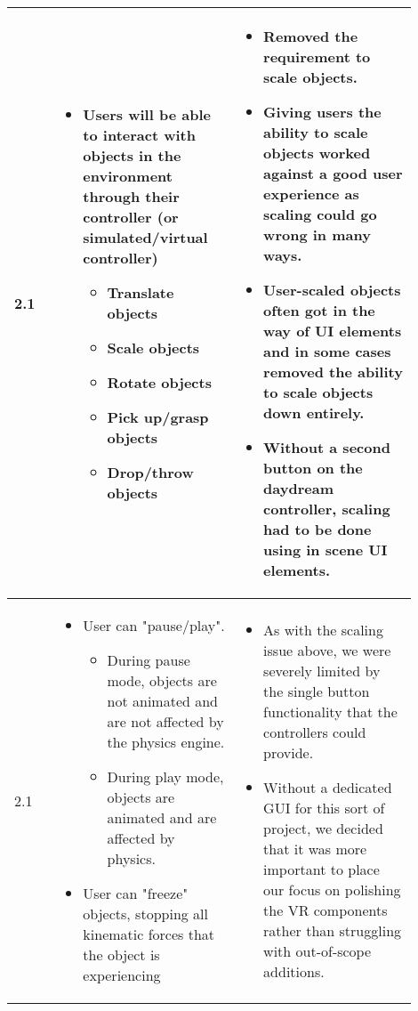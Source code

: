 \documentclass[onecolumn, draftclsnofoot,10pt, compsoc]{IEEEtran}
\begin{document}
\begin{longtable}{ |p{0.1\linewidth}|p{0.4\linewidth}|p{0.4\linewidth}| }
2.1
&
\begin{itemize}
    \item Users will be able to interact with objects in the environment through their controller (or simulated/virtual controller)
    \begin{itemize}
        \item Translate objects
        \item Scale objects
        \item Rotate objects
        \item Pick up/grasp objects
        \item Drop/throw objects
    \end{itemize}
\end{itemize}
& 
\begin{itemize}
    \item Removed the requirement to scale objects.
    \item Giving users the ability to scale objects worked against a good user experience as scaling could go wrong in many ways.
    \item User-scaled objects often got in the way of UI elements and in some cases removed the ability to scale objects down entirely.
    \item Without a second button on the daydream controller, scaling had to be done using in scene UI elements.
\end{itemize} \\
\hline

2.1
&
\begin{itemize}
    \item User can "pause/play". 
    \begin{itemize}
        \item During pause mode, objects are not animated and are not affected by the physics engine.
        \item During play mode, objects are animated and are affected by physics.
    \end{itemize}
    \item User can "freeze" objects, stopping all kinematic forces that the object is experiencing
\end{itemize}
& 
\begin{itemize}
    \item As with the scaling issue above, we were severely limited by the single button functionality that the controllers could provide.
    \item Without a dedicated GUI for this sort of project, we decided that it was more important to place our focus on polishing the VR components rather than struggling with out-of-scope additions.
\end{itemize} \\
\hline


\end{longtable}
\end{document}
